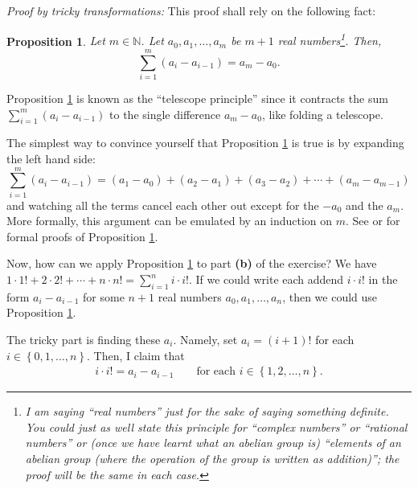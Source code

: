 \documentclass[paper=a4, fontsize=12pt]{scrartcl} %
\newcommand{\NN}{\mathbb{N}} %
\newcommand{\set}[1]{\left\{ #1 \right\}}
\newcommand{\tup}[1]{\left( #1 \right)}
\let\sumnonlimits\sum
\renewcommand{\sum}{\sumnonlimits\limits}
\theoremstyle{plainsl}
\newtheorem{proposition}[theorem]{Proposition}
\theoremstyle{definition}
\theoremstyle{remark}
\begin{document}
\textit{Proof by tricky transformations:} This proof shall rely on the
following fact:

\begin{proposition} \label{prop.sums.telescope}
Let $m \in \NN$.
Let $a_0, a_1, \ldots, a_m$ be $m+1$
real numbers\footnote{I am saying ``real numbers''
just for the sake of saying something definite.
You could just as well state this principle for
``complex numbers'' or ``rational numbers'' or (once we have
learnt what an abelian group is) ``elements of an abelian
group (where the operation of the group is written as
addition)''; the proof will be the same in each case.}.
Then, 
\[
\sum_{i=1}^{m} \tup{ a_i - a_{i-1} } = a_m - a_0 .
\]
\end{proposition}

Proposition \ref{prop.sums.telescope} is known as the ``telescope
principle'' since it contracts the sum
$\sum_{i=1}^{m} \tup{ a_i - a_{i-1} }$
to the single difference $a_m - a_0$, like folding a telescope.

The simplest way to convince yourself that
Proposition \ref{prop.sums.telescope} is true is by expanding the
left hand side: 
\[
\sum_{i=1}^{m} \tup{ a_i - a_{i-1} }
= \tup{a_1 - a_0} + \tup{a_2 - a_1} + \tup{a_3 - a_2}
  + \cdots + \tup{a_m - a_{m-1}}
\]
and watching all the terms cancel each other out except for the $-a_0$ and
the $a_m$. More formally, this argument can be emulated by an induction on 
$m$.
See \cite[proof of Proposition 2.2]{18f-hw0s} or
\cite[proof of (16)]{detnotes} for formal proofs of
Proposition \ref{prop.sums.telescope}.

Now, how can we apply Proposition \ref{prop.sums.telescope} to part
\textbf{(b)} of the exercise?
We have
$1\cdot 1! + 2\cdot 2! + \cdots + n\cdot n! = \sum_{i=1}^{n} i\cdot i!$.
If we could write each addend $i\cdot i!$ in
the form $a_i - a_{i-1}$ for some $n+1$ real numbers
$a_0,a_1,\ldots,a_n$, then we could use
Proposition \ref{prop.sums.telescope}.

The tricky part is finding these $a_i$. Namely, set
$a_i = \tup{i+1}!$ for each $i\in \set{0, 1, \ldots, n}$.
Then, I claim that
\begin{align}
i\cdot i! = a_i - a_{i-1}
\qquad \text{for each } i \in \set{1, 2, \ldots, n} .
\label{sol.factorial.101.b.2nd.diff}
\end{align}
\end{document}
